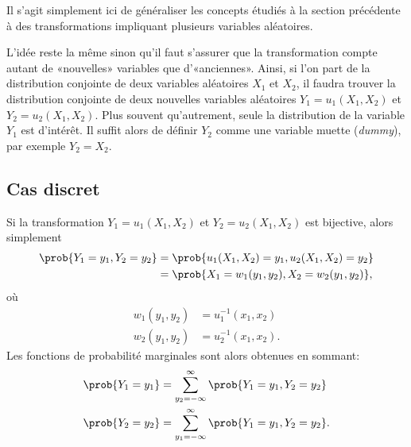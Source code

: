 Il s'agit simplement ici de généraliser les concepts étudiés à la
section précédente à des transformations impliquant plusieurs
variables aléatoires.

L'idée reste la même sinon qu'il faut s'assurer que la transformation
compte autant de «nouvelles» variables que d'«anciennes». Ainsi, si
l'on part de la distribution conjointe de deux variables aléatoires
$X_1$ et $X_2$, il faudra trouver la distribution conjointe de deux
nouvelles variables aléatoires $Y_1 = u_1(X_1, X_2)$ et $Y_2 =
u_2(X_1, X_2)$. Plus souvent qu'autrement, seule la distribution de la
variable $Y_1$ est d'intérêt. Il suffit alors de définir $Y_2$ comme
une variable muette (\emph{dummy}), par exemple $Y_2 = X_2$.


\subsection{Cas discret}

Si la transformation $Y_1 = u_1(X_1, X_2)$ et $Y_2 = u_2(X_1, X_2)$
est bijective, alors simplement
\begin{align*}
  \prob{Y_1 = y_1, Y_2 = y_2}
  &= \prob{u_1(X_1, X_2) = y_1, u_2(X_1, X_2) = y_2} \\
  &= \prob{X_1 = w_1(y_1, y_2), X_2 = w_2(y_1, y_2)},
\end{align*}
où
\begin{align*}
  w_1(y_1, y_2) &= u_1^{-1}(x_1, x_2) \\
  w_2(y_1, y_2) &= u_2^{-1}(x_1, x_2).
\end{align*}
Les fonctions de probabilité marginales sont alors obtenues en
sommant:
\begin{align*}
  \prob{Y_1 = y_1} &=
  \sum_{y_2 = -\infty}^\infty \prob{Y_1 = y_1, Y_2 = y_2} \\
  \prob{Y_2 = y_2} &=
  \sum_{y_1 = -\infty}^\infty \prob{Y_1 = y_1, Y_2 = y_2}.
\end{align*}

